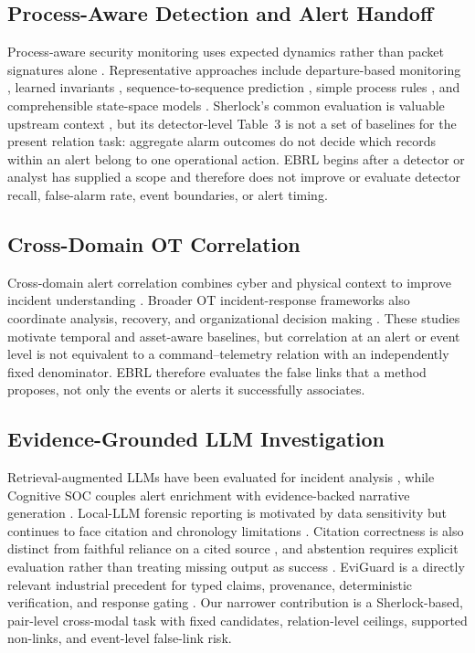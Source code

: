 \documentclass[conference]{IEEEtran}
\begin{document}
\subsection{Process-Aware Detection and Alert Handoff}

Process-aware security monitoring uses expected dynamics rather than packet signatures alone \cite{rehman2024processaware}. Representative approaches include departure-based monitoring \cite{aoudi2018pasad}, learned invariants \cite{feng2019invariants}, sequence-to-sequence prediction \cite{kim2020seq2seq}, simple process rules \cite{wolsing2022simple}, and comprehensible state-space models \cite{wolsing2025geco}. Sherlock's common evaluation is valuable upstream context \cite{wagner2025sherlock}, but its detector-level Table~3 is not a set of baselines for the present relation task: aggregate alarm outcomes do not decide which records within an alert belong to one operational action. EBRL begins after a detector or analyst has supplied a scope and therefore does not improve or evaluate detector recall, false-alarm rate, event boundaries, or alert timing.

\subsection{Cross-Domain OT Correlation}

Cross-domain alert correlation combines cyber and physical context to improve incident understanding \cite{koucham2022crossdomain}. Broader OT incident-response frameworks also coordinate analysis, recovery, and organizational decision making \cite{smith2021air4ics,staves2022incidentresponse}. These studies motivate temporal and asset-aware baselines, but correlation at an alert or event level is not equivalent to a command--telemetry relation with an independently fixed denominator. EBRL therefore evaluates the false links that a method proposes, not only the events or alerts it successfully associates.

\subsection{Evidence-Grounded LLM Investigation}

Retrieval-augmented LLMs have been evaluated for incident analysis \cite{cadet2026retrieval}, while Cognitive SOC couples alert enrichment with evidence-backed narrative generation \cite{sheikhi2025cognitive}. Local-LLM forensic reporting is motivated by data sensitivity but continues to face citation and chronology limitations \cite{dehing2026structured}. Citation correctness is also distinct from faithful reliance on a cited source \cite{wallat2025correctness}, and abstention requires explicit evaluation rather than treating missing output as success \cite{wen2025know}. EviGuard is a directly relevant industrial precedent for typed claims, provenance, deterministic verification, and response gating \cite{zhou2026eviguard}. Our narrower contribution is a Sherlock-based, pair-level cross-modal task with fixed candidates, relation-level ceilings, supported non-links, and event-level false-link risk.
\end{document}
